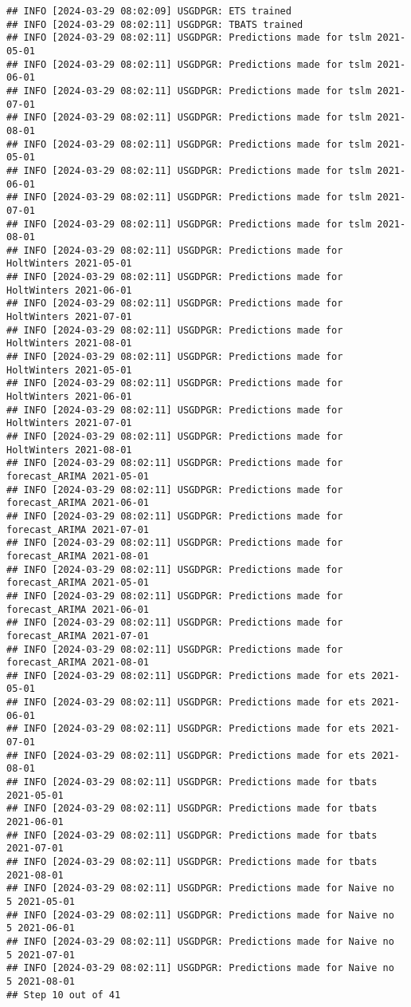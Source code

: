 \documentclass[
]{article}
\begin{document}
\begin{verbatim}
## INFO [2024-03-29 08:02:09] USGDPGR: ETS trained
## INFO [2024-03-29 08:02:11] USGDPGR: TBATS trained
## INFO [2024-03-29 08:02:11] USGDPGR: Predictions made for tslm 2021-05-01
## INFO [2024-03-29 08:02:11] USGDPGR: Predictions made for tslm 2021-06-01
## INFO [2024-03-29 08:02:11] USGDPGR: Predictions made for tslm 2021-07-01
## INFO [2024-03-29 08:02:11] USGDPGR: Predictions made for tslm 2021-08-01
## INFO [2024-03-29 08:02:11] USGDPGR: Predictions made for tslm 2021-05-01
## INFO [2024-03-29 08:02:11] USGDPGR: Predictions made for tslm 2021-06-01
## INFO [2024-03-29 08:02:11] USGDPGR: Predictions made for tslm 2021-07-01
## INFO [2024-03-29 08:02:11] USGDPGR: Predictions made for tslm 2021-08-01
## INFO [2024-03-29 08:02:11] USGDPGR: Predictions made for HoltWinters 2021-05-01
## INFO [2024-03-29 08:02:11] USGDPGR: Predictions made for HoltWinters 2021-06-01
## INFO [2024-03-29 08:02:11] USGDPGR: Predictions made for HoltWinters 2021-07-01
## INFO [2024-03-29 08:02:11] USGDPGR: Predictions made for HoltWinters 2021-08-01
## INFO [2024-03-29 08:02:11] USGDPGR: Predictions made for HoltWinters 2021-05-01
## INFO [2024-03-29 08:02:11] USGDPGR: Predictions made for HoltWinters 2021-06-01
## INFO [2024-03-29 08:02:11] USGDPGR: Predictions made for HoltWinters 2021-07-01
## INFO [2024-03-29 08:02:11] USGDPGR: Predictions made for HoltWinters 2021-08-01
## INFO [2024-03-29 08:02:11] USGDPGR: Predictions made for forecast_ARIMA 2021-05-01
## INFO [2024-03-29 08:02:11] USGDPGR: Predictions made for forecast_ARIMA 2021-06-01
## INFO [2024-03-29 08:02:11] USGDPGR: Predictions made for forecast_ARIMA 2021-07-01
## INFO [2024-03-29 08:02:11] USGDPGR: Predictions made for forecast_ARIMA 2021-08-01
## INFO [2024-03-29 08:02:11] USGDPGR: Predictions made for forecast_ARIMA 2021-05-01
## INFO [2024-03-29 08:02:11] USGDPGR: Predictions made for forecast_ARIMA 2021-06-01
## INFO [2024-03-29 08:02:11] USGDPGR: Predictions made for forecast_ARIMA 2021-07-01
## INFO [2024-03-29 08:02:11] USGDPGR: Predictions made for forecast_ARIMA 2021-08-01
## INFO [2024-03-29 08:02:11] USGDPGR: Predictions made for ets 2021-05-01
## INFO [2024-03-29 08:02:11] USGDPGR: Predictions made for ets 2021-06-01
## INFO [2024-03-29 08:02:11] USGDPGR: Predictions made for ets 2021-07-01
## INFO [2024-03-29 08:02:11] USGDPGR: Predictions made for ets 2021-08-01
## INFO [2024-03-29 08:02:11] USGDPGR: Predictions made for tbats 2021-05-01
## INFO [2024-03-29 08:02:11] USGDPGR: Predictions made for tbats 2021-06-01
## INFO [2024-03-29 08:02:11] USGDPGR: Predictions made for tbats 2021-07-01
## INFO [2024-03-29 08:02:11] USGDPGR: Predictions made for tbats 2021-08-01
## INFO [2024-03-29 08:02:11] USGDPGR: Predictions made for Naive no  5 2021-05-01
## INFO [2024-03-29 08:02:11] USGDPGR: Predictions made for Naive no  5 2021-06-01
## INFO [2024-03-29 08:02:11] USGDPGR: Predictions made for Naive no  5 2021-07-01
## INFO [2024-03-29 08:02:11] USGDPGR: Predictions made for Naive no  5 2021-08-01
## Step 10 out of 41
\end{verbatim}
\end{document}
